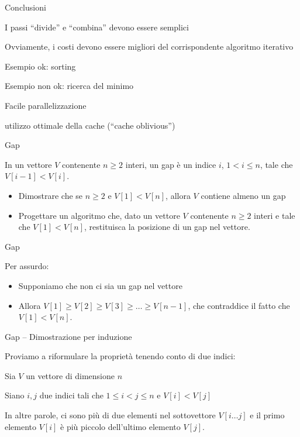 \begin{frame}{Conclusioni}

\BIL
\item I passi “divide” e “combina” devono essere semplici
\item Ovviamente, i costi devono essere migliori del corrispondente algoritmo iterativo
\BI 
\item Esempio ok: sorting 
\item Esempio non ok: ricerca del minimo
\EI
\EIL

\bigskip
{}
\BIL
\item Facile parallelizzazione
\item utilizzo ottimale della cache (“cache oblivious”)
\EIL

\end{frame}

\begin{frame}{Gap}
\begin{myboxtitle}[Gap]
In un vettore $V$ contenente $n \geq 2$ interi, un \alert{gap} è un indice $i$, $1 < i \leq n$,
tale che $V[i-1]<V[i]$.
\begin{itemize}
\item Dimostrare che se $n \geq 2$ e $V[1]<V[n]$, allora $V$ contiene almeno un gap
\item Progettare un algoritmo che, dato un vettore $V$ contenente $n \geq 2$
interi e tale che $V[1]<V[n]$, restituisca la posizione di un gap nel vettore.
\end{itemize}
\end{myboxtitle}

\end{frame}

\begin{frame}{Gap}

Per assurdo:
\begin{itemize}
\item Supponiamo che non ci sia un gap nel vettore
\item Allora $V[1] \geq  V[2] \geq V[3] \geq \ldots \geq V[n-1]$, che contraddice 
il fatto che $V[1]<V[n]$.
\end{itemize}
\end{frame}

\begin{frame}{Gap -- Dimostrazione per induzione}

Proviamo a riformulare la proprietà tenendo conto di due indici:
\BIL
\item Sia $V$ un vettore di dimensione $n$
\item Siano $i,j$ due indici tali che  
$1 \leq i < j \leq n$ e $V[i]<V[j]$
\EIL

\bigskip
In altre parole, ci sono più di due elementi nel sottovettore
$V[i \ldots j]$ e il primo elemento $V[i]$ è più piccolo dell'ultimo
elemento $V[j]$.
\end{frame}

